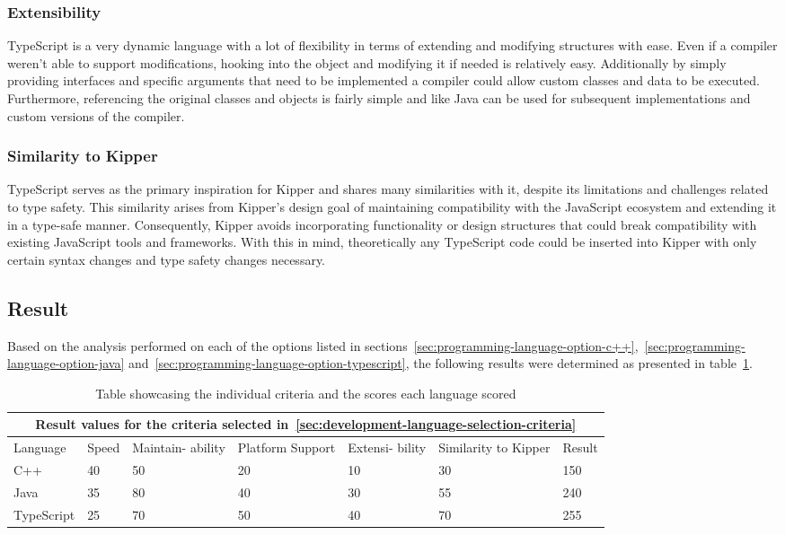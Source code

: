 \subsubsection{Extensibility}

TypeScript is a very dynamic language with a lot of flexibility in terms of extending and modifying structures with ease. Even if a compiler weren't able to support modifications, hooking into the object and modifying it if needed is relatively easy. Additionally by simply providing interfaces and specific arguments that need to be implemented a compiler could allow custom classes and data to be executed. Furthermore, referencing the original classes and objects is fairly simple and like Java can be used for subsequent implementations and custom versions of the compiler.

\subsubsection{Similarity to Kipper}

TypeScript serves as the primary inspiration for Kipper and shares many similarities with it, despite its limitations and challenges related to type safety. This similarity arises from Kipper's design goal of maintaining compatibility with the JavaScript ecosystem and extending it in a type-safe manner. Consequently, Kipper avoids incorporating functionality or design structures that could break compatibility with existing JavaScript tools and frameworks. With this in mind, theoretically any TypeScript code could be inserted into Kipper with only certain syntax changes and type safety changes necessary.

\subsection{Result}

Based on the analysis performed on each of the options listed in sections~\ref{sec:programming-language-option-c++},~\ref{sec:programming-language-option-java} and~\ref{sec:programming-language-option-typescript}, the following results were determined as presented in table~\ref{tab:programming-language-results}.

\begin{table}[H]
	\centering
	\begin{tabular}{ |p{2cm}|p{1.8cm}|p{1.8cm}|p{1.8cm}|p{1.8cm}|p{1.8cm}|p{1.2cm}|  }
		\hline
		\multicolumn{7}{|c|}{Result values for the criteria selected in~\ref{sec:development-language-selection-criteria}} \\
		\hline
		Language&Speed&Maintain- ability&Platform Support&Extensi- bility&Similarity to Kipper&Result\\
		\hline
		C++&40&50&20&10&30&150\\
		Java&35&80&40&30&55&240\\
		TypeScript&25&70&50&40&70&255\\
		\hline
	\end{tabular}
	\caption{Table showcasing the individual criteria and the scores each language scored}
	\label{tab:programming-language-results}
\end{table}

